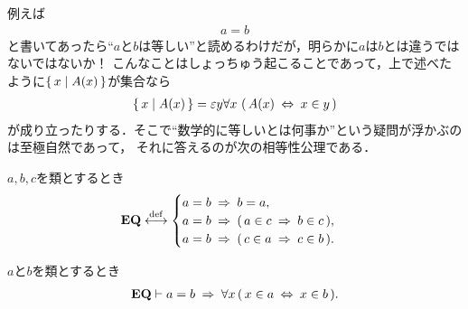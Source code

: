 	例えば
	\begin{align}
		a = b
	\end{align}
	と書いてあったら``$a$と$b$は等しい''と読めるわけだが，明らかに$a$は$b$とは違うではないではないか！
	こんなことはしょっちゅう起こることであって，上で述べたように$\left\{\, x \mid A(x)\, \right\}$が集合なら
	\begin{align}
		\left\{\, x \mid A(x)\, \right\} = \varepsilon y \forall x\, \left(\, A(x) \hspace{0.25em}\Leftrightarrow\hspace{0.25em} x \in y\, \right)
	\end{align}
	が成り立ったりする．そこで``数学的に等しいとは何事か''という疑問が浮かぶのは至極自然であって，
	それに答えるのが次の相等性公理である．
	
	\begin{screen}
		\begin{axm}[相等性公理]
			$a,b,c$を類とするとき
			\begin{align}
				\mbox{{\bf EQ}} \overset{\mathrm{def}}{\longleftrightarrow}
				\begin{cases}
					a = b \hspace{0.25em}\Rightarrow\hspace{0.25em} b = a, & \\
					a = b \hspace{0.25em}\Rightarrow\hspace{0.25em} (\, a \in c \hspace{0.25em}\Rightarrow\hspace{0.25em} b \in c\, ), & \\
					a = b \hspace{0.25em}\Rightarrow\hspace{0.25em} (\, c \in a \hspace{0.25em}\Rightarrow\hspace{0.25em} c \in b\, ). & 
				\end{cases}
			\end{align}
		\end{axm}
	\end{screen}
	
	\begin{screen}
		\begin{thm}[外延性の公理の逆も成り立つ]
		\label{thm:inverse_of_axiom_of_extensionality}
		\label{thm:axiom_of_extensionality_equivalent}
			$a$と$b$を類とするとき
			\begin{align}
				\mbox{{\bf EQ}} \vdash 
				a = b \hspace{0.25em}\Rightarrow\hspace{0.25em} \forall x\, (\, x \in a  \hspace{0.25em}\Leftrightarrow\hspace{0.25em} x \in b\, ).
			\end{align}
		\end{thm}
	\end{screen}
	
